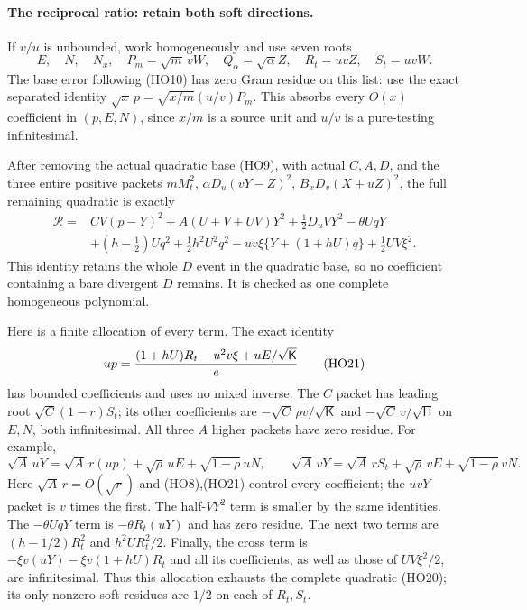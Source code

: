 \paragraph{The reciprocal ratio: retain both soft directions.}
If $v/u$ is unbounded, work homogeneously and use seven roots
\[
 E,\quad N,\quad N_x,\quad
 P_m=\sqrt m\,vW,\quad Q_\alpha=\sqrt\alpha Z,\quad
 R_t=uvZ,\quad S_t=uvW .
 \tag{HO19}
\]
The base error following (HO10) has zero Gram residue on this list:
use the exact separated identity
$\sqrt x\,p=\sqrt{x/m}(u/v)P_m$.
This absorbs every $O(x)$ coefficient in $(p,E,N)$, since $x/m$
is a source unit and $u/v$ is a pure-testing infinitesimal.

After removing the actual quadratic base (HO9), with actual $C,A,D$,
and the three entire positive packets
$mM_t^2$, $\alpha D_u(vY-Z)^2$,
$B_xD_v(X+uZ)^2$, the full remaining quadratic is exactly
\[
 \begin{split}
 \mathcal R={}&CV(p-Y)^2+A(U+V+UV)Y^2
                      +\tfrac12D_uVY^2-\theta UqY\\
 &+(h-\tfrac12)Uq^2+\tfrac12h^2U^2q^2
       -uv\xi\{Y+(1+hU)q\}+\tfrac12UV\xi^2 .
 \end{split}
 \tag{HO20}
\]
This identity retains the whole $D$ event in the quadratic base,
so no coefficient containing a bare divergent $D$ remains.
It is checked as one complete homogeneous polynomial.

Here is a finite allocation of every term. The exact identity
\[
 up={(1+hU)R_t-u^2v\xi+uE/\sqrt{\mathsf K}\over e}
 \tag{HO21}
\]
has bounded coefficients and uses no mixed inverse.
The $C$ packet has leading root
$\sqrt C(1-r)S_t$; its other coefficients are
$-\sqrt C\,\rho v/\sqrt{\mathsf K}$ and
$-\sqrt C\,v/\sqrt{\mathsf H}$ on $E,N$, both infinitesimal.
All three $A$ higher packets have zero residue. For example,
\[
 \sqrt A\,uY=\sqrt A\,r(up)+\sqrt\rho\,uE+
                               \sqrt{1-\rho}\,uN,\qquad
 \sqrt A\,vY=\sqrt A\,rS_t+\sqrt\rho\,vE+
                               \sqrt{1-\rho}\,vN .
 \tag{HO22}
\]
Here $\sqrt A\,r=O(\sqrt r)$ and (HO8),(HO21)
control every coefficient; the $uvY$ packet is $v$ times the first.
The half-$VY^2$ term is smaller by the same identities.
The $-\theta UqY$ term is $-\theta R_t(uY)$ and has zero residue.
The next two terms are $(h-1/2)R_t^2$ and
$h^2U R_t^2/2$.
Finally, the cross term is
$-\xi v(uY)-\xi v(1+hU)R_t$ and all its coefficients,
as well as those of $UV\xi^2/2$, are infinitesimal.
Thus this allocation exhausts the complete quadratic (HO20);
its only nonzero soft residues are $1/2$ on each of $R_t,S_t$.

